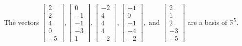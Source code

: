 \begin{exercise}
\begin{exerciseStatement}
  \end{exerciseStatement}
  \begin{exerciseAnswer}
   The vectors \(\left[\begin{array}{r}
2 \\
2 \\
4 \\
0 \\
-5
\end{array}\right] , \left[\begin{array}{r}
0 \\
-1 \\
-1 \\
-3 \\
1
\end{array}\right] , \left[\begin{array}{r}
-2 \\
4 \\
4 \\
4 \\
-2
\end{array}\right] , \left[\begin{array}{r}
-1 \\
0 \\
-1 \\
-4 \\
-2
\end{array}\right] , \text{ and } \left[\begin{array}{r}
2 \\
1 \\
2 \\
-3 \\
-5
\end{array}\right]\) 
  	 are  a basis of \(\mathbb{R}^5\).
  


  \end{exerciseAnswer}
\end{exercise}